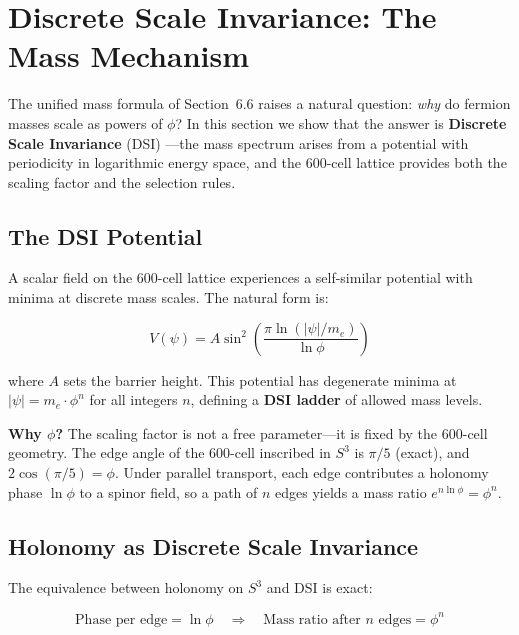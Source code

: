 \documentclass[12pt,a4paper]{article}
\begin{document}
\section{Discrete Scale Invariance: The Mass Mechanism}
\label{sec:dsi}

The unified mass formula of Section~6.6 raises a natural question: \emph{why} do fermion masses scale as powers of $\phi$? In this section we show that the answer is \textbf{Discrete Scale Invariance} (DSI) \cite{sornette1998}---the mass spectrum arises from a potential with periodicity in logarithmic energy space, and the 600-cell lattice provides both the scaling factor and the selection rules.

\subsection{The DSI Potential}

A scalar field on the 600-cell lattice experiences a self-similar potential with minima at discrete mass scales. The natural form is:

\begin{equation}
\boxed{V(\psi) = A \sin^2\!\left(\frac{\pi \ln(|\psi|/m_e)}{\ln\phi}\right)}
\label{eq:dsi_potential}
\end{equation}

where $A$ sets the barrier height. This potential has degenerate minima at $|\psi| = m_e \cdot \phi^n$ for all integers $n$, defining a \textbf{DSI ladder} of allowed mass levels.

\textbf{Why $\phi$?} The scaling factor is not a free parameter---it is fixed by the 600-cell geometry. The edge angle of the 600-cell inscribed in $S^3$ is $\pi/5$ (exact), and $2\cos(\pi/5) = \phi$. Under parallel transport, each edge contributes a holonomy phase $\ln\phi$ to a spinor field, so a path of $n$ edges yields a mass ratio $e^{n\ln\phi} = \phi^n$.

\subsection{Holonomy as Discrete Scale Invariance}

The equivalence between holonomy on $S^3$ and DSI is exact:

\begin{equation}
\text{Phase per edge} = \ln\phi \quad \Longrightarrow \quad \text{Mass ratio after } n \text{ edges} = \phi^n
\end{equation}
\end{document}
